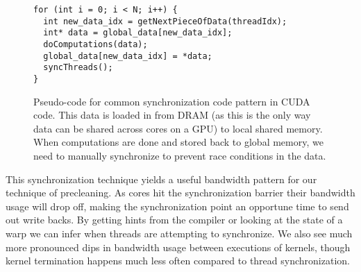 \begin{figure}[htb]
\begin{center}

\begin{lstlisting}
for (int i = 0; i < N; i++) {
  int new_data_idx = getNextPieceOfData(threadIdx);
  int* data = global_data[new_data_idx];
  doComputations(data);
  global_data[new_data_idx] = *data;
  syncThreads();
}
\end{lstlisting}
\caption{Pseudo-code for common synchronization code pattern in CUDA code. This data is loaded in from DRAM (as this is the only way data can be shared across cores on a GPU) to local shared memory. When computations are done and stored back to global memory, we need to manually synchronize to prevent race conditions in the data.}
\label{f:cuda_sync}
\end{center}
\end{figure}
%


This synchronization technique yields a useful bandwidth pattern for our technique of precleaning. As cores hit the synchronization barrier their bandwidth usage will drop off, making the synchronization point an opportune time to send out write backs. By getting hints from the compiler or looking at the state of a warp we can infer when threads are attempting to synchronize. We also see much more pronounced dips in bandwidth usage between executions of kernels, though kernel termination happens much less often compared to thread synchronization.
